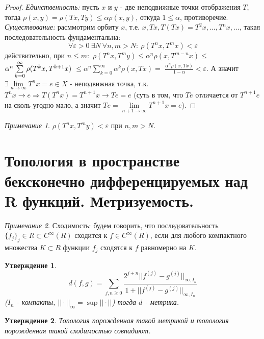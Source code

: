 \documentclass{article}
\theoremstyle{indented}
\newtheorem{stat}{Утверждение}
\theoremstyle{definition}
\theoremstyle{remark}
\newtheorem{remark}{Примечание}
\begin{document}
\begin{proof}
    \textit{Единственность:} пусть $x$ и $y$ - две неподвижные точки отображения $T$, тогда 
    $\rho (x,y) = \rho (T x, T y) \leq \alpha \rho (x,y)$, откуда $1 \leq \alpha$, противоречие. \\
    \textit{Существование:} расммотрим орбиту $x$, т.е. $x, Tx, T(Tx)=T^2 x, ... , T^n x, ...$, такая последовательность фундаментальна:
    $$\forall \varepsilon > 0 \ \exists N \ \forall n,m > N: \ \rho (T^n x, T^m x) < \varepsilon $$
    действительно, при $n \leq m:$ 
    $\rho (T^n x, T^m y) \leq \alpha^n \rho (x, T^{m-n} x) \leq $  
    $\alpha^n \sum\limits_{k=0}^{\infty} \rho (T^k x, T^{k+1} x) \\$ 
    $\leq \alpha^n \sum\limits_{k=0}^{\infty} \alpha^k \rho (x, Tx) = $
    $\frac{\alpha^n \rho (x,Tx)}{1-\alpha}  < \varepsilon$. 
    А значит $\exists \lim\limits_{n \to \infty} T^n x = e \in X$ - неподвижная точка, 
    т.к. $T^n x \to e \Rightarrow T(T^n x) = T^{n+1} x \to Te = e$ (суть в том, что $Te$ отличается от $T^{n+1}e$ на сколь угодно мало,
    а значит $Te = \lim\limits_{n+1 \to \infty} T^{n+1} x = e$).  
\end{proof}

\begin{remark}
    $\rho(T^n x, T^m y) < \varepsilon$ при $n,m>N$.
\end{remark}
\section{Топология в пространстве бексконечно дифференцируемых над R функций. Метризуемость.}

\begin{remark}
    Сходимость: будем говорить, что последовательность
    $\{f_j\}_j\in R \subset C^\infty(R)$ сходится к $f \in C^\infty(R)$, 
    если для любого компактного множества $K \subset R$ функции $f_j$
    сходятся к $f$ равномерно на $K$.
\end{remark}

\begin{stat}
    $$
    d(f,g) = \sum\limits_{j,n\geq 0} \frac{ 2^{j+n} ||f^{(j)}-g^{(j)}||_{\infty, I_n}}{1+||f^{(j)}-g^{(j)}||_{\infty, I_n}}
    $$
    ($I_n$ - компакты, $||\cdot||_\infty = \sup||\cdot||$) тогда $d$ - метрика.
\end{stat}

\begin{stat}
    Топология порожденная такой метрикой и топология порожденная такой сходимостью совпадают.
\end{stat}

\newpage
\hypertarget{t2}{}
\printindex
\end{document}
